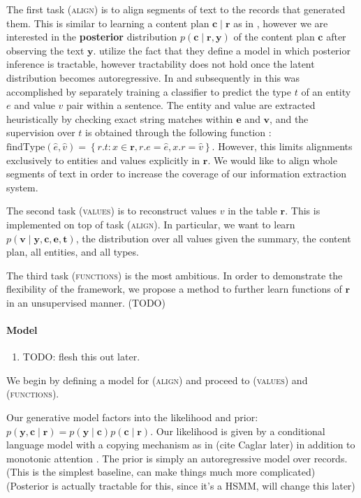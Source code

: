 \documentclass[11pt]{article}
\newcommand\set[1]{\left\{#1\right\}}
\newcommand{\bc}{\mathbf{c}}
\newcommand{\be}{\mathbf{e}}
\newcommand{\br}{\mathbf{r}}
\newcommand{\bt}{\mathbf{t}}
\newcommand{\bv}{\mathbf{v}}
\newcommand{\by}{\mathbf{y}}
\begin{document}
The first task (\textsc{align}) is to align segments of text to the records that generated them.
This is similar to learning a content plan $\bc\mid\br$ as in \citet{puduppully2018contentselection},
however we are interested in the \textbf{posterior} distribution $p(\bc\mid\br,\by)$ of
the content plan $\bc$ after observing the text $\by$.
\citet{liang2009semalign} utilize the fact that they define a model in which posterior inference is tractable,
however tractability does not hold once the latent distribution becomes autoregressive.
In \citet{wiseman2017d2t} and subsequently in \citet{puduppully2018contentselection} this was accomplished by 
separately training a classifier to predict the type $t$ of an entity $e$ and value $v$ pair within a sentence.
The entity and value are extracted heuristically by checking exact string matches within $\be$ and $\bv$,
and the supervision over $t$ is obtained through the following function \citep{wiseman2017d2t}:
$\text{findType}(\hat{e},\hat{v}) = \set{ r.t :x\in\br, r.e = \hat{e}, x.r = \hat{v}}$.
However, this limits alignments exclusively to entities and values explicitly in $\br$.
We would like to align whole segments of text in order to increase the coverage
of our information extraction system.


The second task (\textsc{values}) is to reconstruct values $v$ in the table $\br$.
This is implemented on top of task (\textsc{align}).
In particular, we want to learn $p(\bv \mid \by,\bc,\be,\bt)$,
the distribution over all values given the summary, the content plan, all entities, and all types.

The third task (\textsc{functions}) is the most ambitious.
In order to demonstrate the flexibility of the framework,
we propose a method to further learn functions of $\br$ in an unsupervised manner.
(TODO)

\paragraph{Model}
\begin{enumerate}
\item TODO: flesh this out later.
\end{enumerate}
We begin by defining a model for (\textsc{align})
and proceed to (\textsc{values}) and (\textsc{functions}).

Our generative model factors into the
likelihood and prior: $p(\by,\bc\mid\br)=p(\by\mid\bc)p(\bc\mid\br)$.
Our likelihood is given by a conditional language model
with a copying mechanism as in \citet{wiseman2017d2t} (cite Caglar later)
in addition to monotonic attention \citep{yu2016ssnt,wiseman2018template}.
The prior is simply an autoregressive model over records.
(This is the simplest baseline, can make things much more complicated)
(Posterior is actually tractable for this, since it's a HSMM,
will change this later)
\end{document}
